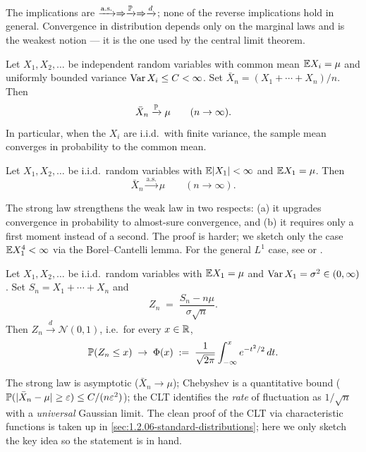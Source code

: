 The implications are
$\xrightarrow{\text{a.s.}} \Rightarrow \xrightarrow{\mathbb{P}} \Rightarrow \xrightarrow{d}$;
none of the reverse implications hold in general. Convergence in
distribution depends only on the marginal laws and is the weakest
notion — it is the one used by the central limit theorem.

\begin{theorem}
\label{thm:wlln}
Let $X_1, X_2, \dots$ be independent random variables with common
mean $\mathbb{E} X_i = \mu$ and uniformly bounded variance $\operatorname{Var} X_i \leq C < \infty$.
Set $\bar X_n = (X_1 + \cdots + X_n)/n$. Then
\[
  \bar X_n \xrightarrow{\mathbb{P}} \mu \qquad (n \to \infty).
\]
In particular, when the $X_i$ are i.i.d.\ with finite variance, the
sample mean converges in probability to the common mean.
\end{theorem}

\begin{theorem}
\label{thm:slln}
Let $X_1, X_2, \dots$ be i.i.d.\ random variables with $\mathbb{E} |X_1| < \infty$
and $\mathbb{E} X_1 = \mu$. Then
\[
  \bar X_n \xrightarrow{\text{a.s.}} \mu \qquad (n \to \infty).
\]
\end{theorem}

The strong law strengthens the weak law in two respects: (a) it
upgrades convergence in probability to almost-sure convergence, and
(b) it requires only a first moment instead of a second. The proof
is harder; we sketch only the case $\mathbb{E} X_1^4 < \infty$ via the
Borel–Cantelli lemma. For the general $L^1$ case, see
\cite[Ch.~III, \S~3]{Shiryaev1989} or \cite[Ch.~VI]{Gnedenko2001}.

\begin{theorem}
\label{thm:clt}
Let $X_1, X_2, \dots$ be i.i.d.\ random variables with $\mathbb{E} X_1 = \mu$
and $\operatorname{Var} X_1 = \sigma^2 \in (0, \infty)$. Set $S_n = X_1 + \cdots + X_n$
and
\[
  Z_n \;=\; \frac{S_n - n\mu}{\sigma \sqrt{n}}.
\]
Then $Z_n \xrightarrow{d} \mathcal{N}(0, 1)$, i.e.\ for every
$x \in \mathbb{R}$,
\[
  \mathbb{P}(Z_n \leq x) \;\to\; \Phi(x) \;:=\; \frac{1}{\sqrt{2\pi}} \int_{-\infty}^{x} e^{-t^2/2}\, dt.
\]
\end{theorem}

\begin{remark}
The strong law is asymptotic ($\bar X_n \to \mu$); Chebyshev is a
quantitative bound ($\mathbb{P}(|\bar X_n - \mu| \geq \varepsilon) \leq C/(n\varepsilon^2)$);
the CLT identifies the \emph{rate} of fluctuation as $1/\sqrt{n}$
with a \emph{universal} Gaussian limit. The clean proof of the CLT
via characteristic functions is taken up in
\cref{sec:1.2.06-standard-distributions}; here we only sketch the
key idea so the statement is in hand.
\end{remark}

